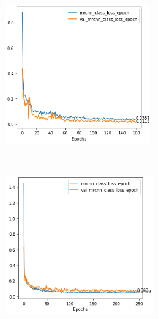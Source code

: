 \documentclass[thesis=B,english]{FITthesis}[2019/12/23]
\begin{document}
\begin{figure}[h]
	\centering
	
	\begin{subfigure}[b]{.48\textwidth}
		\centering
		\includegraphics[height=6cm]{images/feet_model_class_loss.png}
	\end{subfigure}
	~
	\begin{subfigure}[b]{.48\textwidth}
		\centering
		\includegraphics[height=6cm]{images/hands_model_class_loss.png}
	\end{subfigure}
	

\end{figure}
\end{document}

